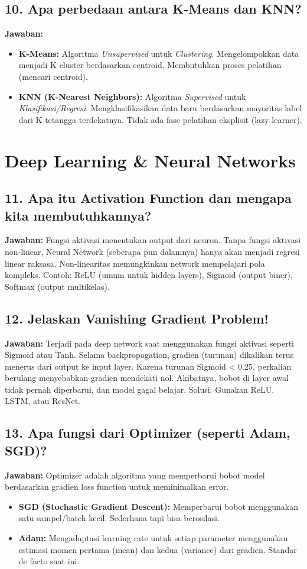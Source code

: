 \subsection{10. Apa perbedaan antara K-Means dan KNN?}
\textbf{Jawaban:}
\begin{itemize}
    \item \textbf{K-Means:} Algoritma \textit{Unsupervised} untuk \textit{Clustering}. Mengelompokkan data menjadi K cluster berdasarkan centroid. Membutuhkan proses pelatihan (mencari centroid).
    \item \textbf{KNN (K-Nearest Neighbors):} Algoritma \textit{Supervised} untuk \textit{Klasifikasi/Regresi}. Mengklasifikasikan data baru berdasarkan mayoritas label dari K tetangga terdekatnya. Tidak ada fase pelatihan eksplisit (lazy learner).
\end{itemize}

\section{Deep Learning \& Neural Networks}

\subsection{11. Apa itu Activation Function dan mengapa kita membutuhkannya?}
\textbf{Jawaban:}
Fungsi aktivasi menentukan output dari neuron. Tanpa fungsi aktivasi non-linear, Neural Network (seberapa pun dalamnya) hanya akan menjadi regresi linear raksasa. Non-linearitas memungkinkan network mempelajari pola kompleks.
Contoh: ReLU (umum untuk hidden layers), Sigmoid (output biner), Softmax (output multikelas).

\subsection{12. Jelaskan Vanishing Gradient Problem!}
\textbf{Jawaban:}
Terjadi pada deep network saat menggunakan fungsi aktivasi seperti Sigmoid atau Tanh. Selama backpropagation, gradien (turunan) dikalikan terus menerus dari output ke input layer. Karena turunan Sigmoid < 0.25, perkalian berulang menyebabkan gradien mendekati nol. Akibatnya, bobot di layer awal tidak pernah diperbarui, dan model gagal belajar. Solusi: Gunakan ReLU, LSTM, atau ResNet.

\subsection{13. Apa fungsi dari Optimizer (seperti Adam, SGD)?}
\textbf{Jawaban:}
Optimizer adalah algoritma yang memperbarui bobot model berdasarkan gradien loss function untuk meminimalkan error.
\begin{itemize}
    \item \textbf{SGD (Stochastic Gradient Descent):} Memperbarui bobot menggunakan satu sampel/batch kecil. Sederhana tapi bisa berosilasi.
    \item \textbf{Adam:} Mengadaptasi learning rate untuk setiap parameter menggunakan estimasi momen pertama (mean) dan kedua (variance) dari gradien. Standar de facto saat ini.
\end{itemize}

